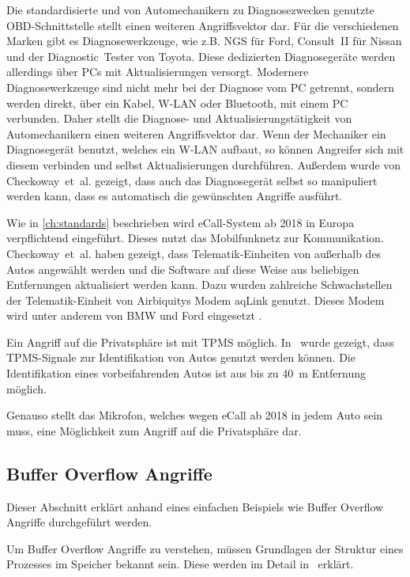Die standardisierte und von Automechanikern zu Diagnosezwecken genutzte
OBD-Schnittstelle stellt einen weiteren Angriffs\-vektor dar. Für die
verschiedenen Marken gibt es Diagnose\-werkzeuge, wie z.B. NGS für Ford,
Consult~II für Nissan und der Diagnostic~Tester von Toyota. Diese dedizierten
Diagnose\-geräte werden allerdings über PCs mit Aktualisierungen versorgt.
Modernere Diagnose\-werkzeuge sind nicht mehr bei der Diagnose vom PC getrennt,
sondern werden direkt, über ein Kabel, \mbox{W-LAN} oder Bluetooth, mit einem PC
verbunden. Daher stellt die Diagnose- und Aktualisierungs\-tätigkeit von
Automechanikern einen weiteren Angriffs\-vektor dar. Wenn der Mechaniker ein
Diagnose\-gerät benutzt, welches ein \mbox{W-LAN} aufbaut, so können Angreifer
sich mit diesem verbinden und selbst Aktualisierungen durchführen. Außerdem
wurde von Checkoway~et~al. gezeigt, dass auch das Diagnose\-gerät selbst so
manipuliert werden kann, dass es automatisch die gewünschten Angriffe ausführt.

Wie in \cref{ch:standards} beschrieben wird eCall-System ab 2018 in Europa
verpflichtend eingeführt. Dieses nutzt das Mobilfunknetz zur Kommunikation.
Checkoway~et~al. haben gezeigt, dass Telematik-Einheiten von außerhalb des
Autos angewählt werden und die Software auf diese Weise aus beliebigen
Entfernungen aktualisiert werden kann. Dazu wurden zahlreiche Schwachstellen
der Telematik-Einheit von Airbiquitys Modem aqLink genutzt. Dieses Modem wird
unter anderem von BMW und Ford eingesetzt \cite{AirbiquityBMW,AirbiquityFord}.

Ein Angriff auf die Privatsphäre ist mit TPMS möglich. In~\cite{Rouf2010} wurde
gezeigt, dass TPMS-Signale zur Identifikation von Autos genutzt werden können.
Die Identifikation eines vorbeifahrenden Autos ist aus bis zu \SI{40}{\meter}
Entfernung möglich.

Genauso stellt das Mikrofon, welches wegen eCall ab 2018 in jedem Auto sein
muss, eine Möglichkeit zum Angriff auf die Privatsphäre dar.


\subsection{Buffer Overflow Angriffe}\label{sec:Buffer-Overflow}
Dieser Abschnitt erklärt anhand eines einfachen Beispiels wie Buffer Overflow
Angriffe durchgeführt werden.

Um Buffer Overflow Angriffe zu verstehen, müssen Grundlagen der Struktur eines
Prozesses im Speicher bekannt sein. Diese werden im Detail
in~\cite{Silberschatz2005} erklärt.

